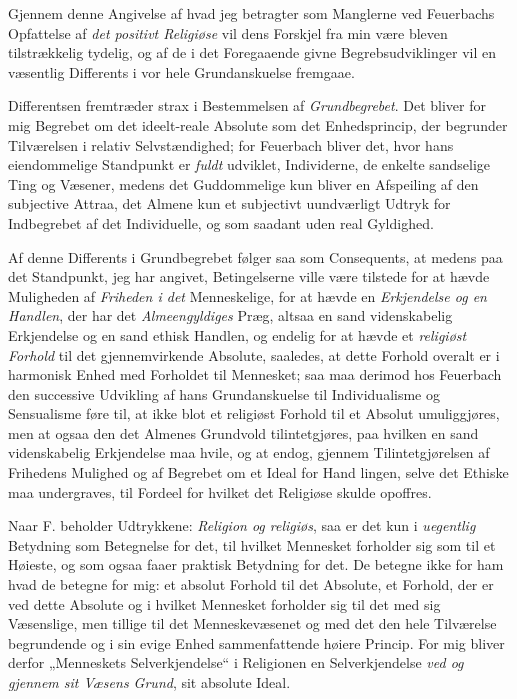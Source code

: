 Gjennem denne Angivelse af hvad jeg betragter som Manglerne ved Feuerbachs
Opfattelse af \emph{det positivt Religiøse} vil dens Forskjel fra min være bleven
tilstrækkelig tydelig, og af de i det Foregaaende givne Begrebsudviklinger vil en
væsentlig Differents i vor hele Grundanskuelse fremgaae.

Differentsen fremtræder strax i Bestemmelsen af \emph{Grundbegrebet}. Det bliver
for mig Begrebet om det ideelt-reale Absolute som det Enhedsprincip, der
begrunder Tilværelsen i relativ Selvstændighed; for Feuerbach bliver det, hvor
hans eiendommelige Standpunkt er \emph{fuldt} udviklet, Individerne, de enkelte
sandselige Ting og Væsener, medens det Guddommelige kun bliver en Afspeiling af
den subjective Attraa, det Almene kun et subjectivt uundværligt Udtryk for
Indbegrebet af det Individuelle, og som saadant uden real Gyldighed.

Af denne Differents i Grundbegrebet følger saa som Consequents, at medens paa det
Standpunkt, jeg har angivet, Betingelserne ville være tilstede for at hævde
Muligheden af \emph{Friheden i det} Menneskelige, for at hævde en
\emph{Erkjendelse og en Handlen}, der har det \emph{Almeengyldiges} Præg, altsaa
en sand videnskabelig Erkjendelse og en sand ethisk Handlen, og endelig for at
hævde et \emph{religiøst Forhold} til det gjennemvirkende Absolute, saaledes, at
dette Forhold overalt er i harmonisk Enhed med Forholdet til Mennesket; saa maa
derimod hos Feuerbach den successive Udvikling af hans Grundanskuelse til
Individualisme og Sensualisme føre til, at ikke blot et religiøst Forhold til et
Absolut umuliggjøres, men at ogsaa den det Almenes Grundvold tilintetgjøres, paa
hvilken en sand videnskabelig Erkjendelse maa hvile, og at endog, gjennem
Tilintetgjørelsen af Frihedens Mulighed og af Begrebet om et Ideal for Hand\-%
lingen, selve det Ethiske maa undergraves, til Fordeel for hvilket det Religiøse
skulde opoffres.

Naar F. beholder Udtrykkene: \emph{Religion og religiøs}, saa er det kun i
\emph{uegentlig} Betydning som Betegnelse for det, til hvilket Mennesket
forholder sig som til et Høieste, og som ogsaa faaer praktisk Betydning for det.
De betegne ikke for ham hvad de betegne for mig: et absolut Forhold til det
Absolute, et Forhold, der er ved dette Absolute og i hvilket Mennesket forholder
sig til det med sig Væsenslige, men tillige til det Menneskevæsenet og med det
den hele Tilværelse begrundende og i sin evige Enhed sammenfattende høiere
Princip. For mig bliver derfor „Menneskets Selverkjendelse“ i Religionen en
Selverkjendelse \emph{ved og gjennem sit Væsens Grund}, sit absolute Ideal.

